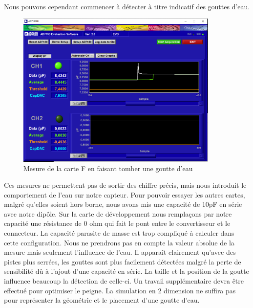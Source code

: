 Nous pouvons cependant commencer à détecter à titre indicatif des gouttes d'eau. 

\begin{figure}[!ht]
\centering
 \includegraphics[width=10cm]{fadeau.png}
 \caption{Mesure de la carte F en faisant tomber une goutte d'eau}
\end{figure}

\newpage
Ces mesures ne permettent pas de sortir des chiffre précis, mais nous introduit le comportement de l'eau sur notre capteur. Pour pouvoir essayer les autres cartes, malgré qu'elles soient hors borne, nous avons mis une capacité de 10pF en série avec notre dipôle. Sur la carte de développement nous remplaçons par notre capacité une résistance de 0 ohm qui fait le pont entre le convertisseur et le connecteur. La capacité parasite de masse est trop compliqué à calculer dans cette configuration. Nous ne prendrons pas en compte la valeur absolue de la mesure mais seulement l’influence de l'eau. Il apparaît clairement qu'avec des pistes plus serrées, les gouttes sont plus facilement détectées malgré la perte de sensibilité dû à l'ajout d'une capacité en série. 
La taille et la position de la goutte influence beaucoup la détection de celle-ci. Un travail supplémentaire devra être effectué pour optimiser le peigne. La simulation en 2 dimension ne suffira pas pour représenter la géométrie et le placement d'une goutte d'eau.

